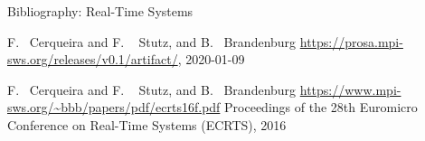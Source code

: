 \documentclass{beamer}
\begin{document}
		
	

		
	\begin{frame}{Bibliography: Real-Time Systems}
		\begin{thebibliography}{10}
		\beamertemplatebookbibitems
		
		F.~ Cerqueira and  F. ~ Stutz, and B.~ Brandenburg
		\newblock {}
		\newblock \url{https://prosa.mpi-sws.org/releases/v0.1/artifact/},  2020-01-09
		
		\beamertemplatearticlebibitems
		
		F.~ Cerqueira and  F. ~ Stutz, and B.~ Brandenburg		
		\newblock {}	
		\newblock \url{https://www.mpi-sws.org/~bbb/papers/pdf/ecrts16f.pdf}
		\newblock Proceedings of the 28th Euromicro Conference on Real-Time Systems (ECRTS), 2016	
		\end{thebibliography}	
	\end{frame}		
	
\end{document}
